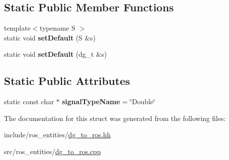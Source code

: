 \subsection*{Static Public Member Functions}
\begin{DoxyCompactItemize}
\item 
{\footnotesize template$<$typename S $>$ }\\static void {\bfseries set\+Default} (S \&s)\hypertarget{structdynamic__graph_1_1DgToRos_3_01double_01_4_ab21237e1e16bdb81d3c31f3be382b8ad}{}\label{structdynamic__graph_1_1DgToRos_3_01double_01_4_ab21237e1e16bdb81d3c31f3be382b8ad}

\item 
static void {\bfseries set\+Default} (dg\+\_\+t \&s)\hypertarget{structdynamic__graph_1_1DgToRos_3_01double_01_4_ad6ad3bc75e6e7d80d44fa9d4c9eee4ea}{}\label{structdynamic__graph_1_1DgToRos_3_01double_01_4_ad6ad3bc75e6e7d80d44fa9d4c9eee4ea}

\end{DoxyCompactItemize}
\subsection*{Static Public Attributes}
\begin{DoxyCompactItemize}
\item 
static const char $\ast$ {\bfseries signal\+Type\+Name} = \char`\"{}Double\char`\"{}\hypertarget{structdynamic__graph_1_1DgToRos_3_01double_01_4_a686b38d74e19c6de7308e8d1ae86cf8c}{}\label{structdynamic__graph_1_1DgToRos_3_01double_01_4_a686b38d74e19c6de7308e8d1ae86cf8c}

\end{DoxyCompactItemize}


The documentation for this struct was generated from the following files\+:\begin{DoxyCompactItemize}
\item 
include/ros\+\_\+entities/\hyperlink{dg__to__ros_8hh}{dg\+\_\+to\+\_\+ros.\+hh}\item 
src/ros\+\_\+entities/\hyperlink{dg__to__ros_8cpp}{dg\+\_\+to\+\_\+ros.\+cpp}\end{DoxyCompactItemize}
